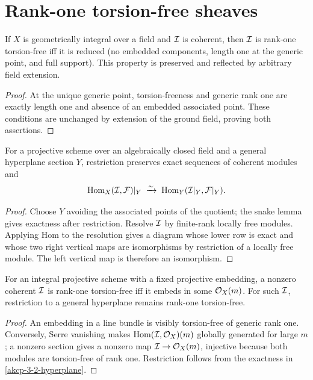 \section{Rank-one torsion-free sheaves}

\begin{lemma}
\label{akcp-3-1-rank-one}
If $X$ is geometrically integral over a field and $\mathcal I$ is coherent, then
$\mathcal I$ is rank-one torsion-free iff it is reduced (no embedded components,
length one at the generic point, and full support).  This property is preserved
and reflected by arbitrary field extension.
\end{lemma}
\begin{proof}
At the unique generic point, torsion-freeness and generic rank one are exactly
length one and absence of an embedded associated point.  These conditions are
unchanged by extension of the ground field, proving both assertions.
\end{proof}

\begin{lemma}
\label{akcp-3-2-hyperplane}
For a projective scheme over an algebraically closed field and a general
hyperplane section $Y$, restriction preserves exact sequences of coherent
modules and
\[
\operatorname{Hom}_X(\mathcal I,\mathcal F)|_Y\;\xrightarrow{\sim}\;
\operatorname{Hom}_Y(\mathcal I|_Y,\mathcal F|_Y).
\]
\end{lemma}
\begin{proof}
Choose $Y$ avoiding the associated points of the quotient; the snake lemma
gives exactness after restriction.  Resolve $\mathcal I$ by finite-rank locally free
modules.  Applying Hom to the resolution gives a diagram whose lower row is
exact and whose two right vertical maps are isomorphisms by restriction of a
locally free module.  The left vertical map is therefore an isomorphism.
\end{proof}

\begin{lemma}
\label{akcp-3-3-embedding}
For an integral projective scheme with a fixed projective embedding, a nonzero
coherent $\mathcal I$ is rank-one torsion-free iff it embeds in some $\mathcal O_X(m)$.
For such $\mathcal I$, restriction to a general hyperplane remains rank-one
torsion-free.
\end{lemma}
\begin{proof}
An embedding in a line bundle is visibly torsion-free of generic rank one.
Conversely, Serre vanishing makes $\operatorname{Hom}(\mathcal I,\mathcal O_X)(m)$ globally generated for
large $m$; a nonzero section gives a nonzero map $\mathcal I\to\mathcal O_X(m)$, injective
because both modules are torsion-free of rank one.  Restriction follows from
the exactness in \cref{akcp-3-2-hyperplane}.
\end{proof}

